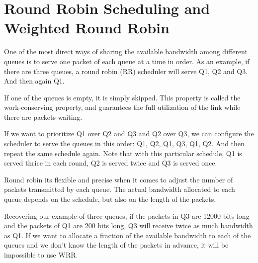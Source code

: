 \section{Round Robin Scheduling and Weighted Round Robin}

One of the most direct ways of sharing the available bandwidth among different queues is to serve one packet of each queue at a time in order.
As an example, if there are three queues, a round robin (RR) scheduler will serve Q1, Q2 and Q3.
And then again Q1.

If one of the queues is empty, it is simply skipped.
This property is called the work-conserving property, and guarantees the full utilization of the link while there are packets waiting.

If we want to prioritize Q1 over Q2 and Q3 and Q2 over Q3, we can configure the scheduler to serve the queues in this order: Q1, Q2, Q1, Q3, Q1, Q2.
And then repeat the same schedule again.
Note that with this particular schedule, Q1 is served thrice in each round, Q2 is served twice and Q3 is served once.

Round robin its flexible and precise when it comes to adjust the number of packets transmitted by each queue.
The actual bandwidth allocated to each queue depends on the schedule, but also on the length of the packets.

Recovering our example of three queues, if the packets in Q3 are 12000 bits long and the packets of Q1 are 200 bits long, Q3 will receive twice as much bandwidth as Q1.
If we want to allocate a fraction of the available bandwidth to each of the queues and we don't know the length of the packets in advance, it will be impossible to use WRR.


